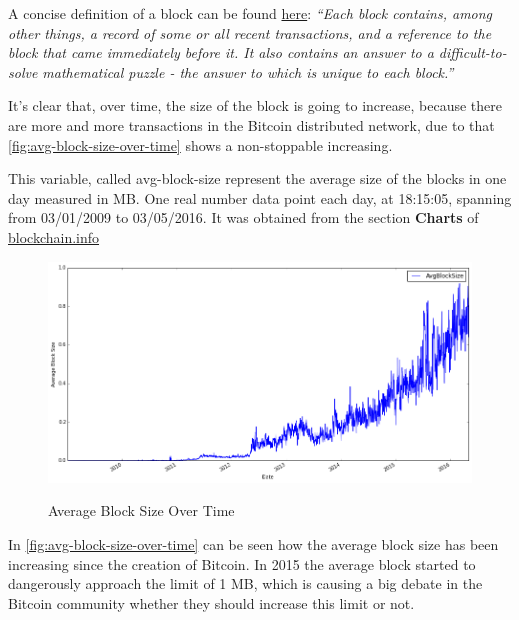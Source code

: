 A concise definition of a block can be found
\href{https://en.bitcoin.it/wiki/Block}{here}: \textit{``Each block
  contains, among other things, a record of some or all recent
  transactions, and a reference to the block that came immediately
  before it. It also contains an answer to a difficult-to-solve
  mathematical puzzle - the answer to which is unique to each
  block.''}

It's clear that, over time, the size of the block is going to
increase, because there are more and more transactions in the Bitcoin
distributed network, due to that
\autoref{fig:avg-block-size-over-time} shows a non-stoppable
increasing.

This variable, called avg-block-size represent the average size of the
blocks in one day measured in MB. One real number data point each day,
at 18:15:05, spanning from 03/01/2009 to 03/05/2016. It was obtained
from the section \textbf{Charts} of
\href{blockchain.info}{blockchain.info}

\begin{figure}[bth]
  \myfloatalign
  {\includegraphics[width=1\linewidth]
    {gfx/avg-block-size-over-time}} 
  \caption{Average Block Size Over Time}
  \label{fig:avg-block-size-over-time}
\end{figure}

In \autoref{fig:avg-block-size-over-time} can be seen how the average
block size has been increasing since the creation of Bitcoin. In 2015
the average block started to dangerously approach the limit of 1 MB,
which is causing a big debate in the Bitcoin community whether they
should increase this limit or not.

